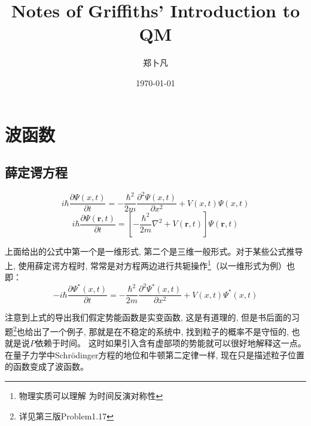 \documentclass[a4paper,zihao=-4,linespread=1]{ctexrep}
\title{Notes of Griffiths' Introduction to QM}   %
\author{郑卜凡}                     %
\date{\today}                             %
\newenvironment{lequation}{\large\begin{equation}}{\end{equation}}
\begin{document}
    \tableofcontents        %
    \setcounter{page}{0}
    \thispagestyle{empty}
    \chapter{波函数}
    \section{薛定谔方程}
    \begin{lequation}\label{S-1-D}
        \boxed{
            i\hbar\frac{\partial \Psi\left(x,t\right)}{\partial t}=-\frac{\hbar^{2}}{2m}\frac{\partial^{2}\Psi\left(x,t\right)}{\partial x^{2}}+
            V\left(x,t\right)\Psi\left(x,t\right)
        }
    \end{lequation}
    \begin{lequation}\label{S-3-D}
        \boxed{
            i\hbar\frac{\partial \Psi\left(\bm{r},t\right)}{\partial t}=\left[-\frac{\hbar^{2}}{2m}\nabla^{2}+
            V\left(\bm{r},t\right)\right]\Psi\left(\bm{r},t\right) 
        }
    \end{lequation}


    上面给出的公式中第一个是一维形式, 第二个是三维一般形式。对于某些公式推导上, 使用薛定谔方程时, 常常是对方程两边进行共轭操作\footnote{物理实质可以理解
    为时间反演对称性}（以一维形式为例）也即：
    \begin{lequation}
        -i\hbar\frac{\partial \Psi^{*}\left(x,t\right)}{\partial t}=-\frac{\hbar^{2}}{2m}\frac{\partial^{2}\Psi^{*}\left(x,t\right)}{\partial x^{2}}+
        V\left(x,t\right)\Psi^{*}\left(x,t\right)
    \end{lequation}


    注意到上式的导出我们假定势能函数是实变函数, 这是有道理的, 但是书后面的习题\footnote{详见第三版Problem1.17}也给出了一个例子, 那就是在不稳定的系统中, 找到粒子的概率不是守恒的, 也就是说$P$依赖于时间。
    这时如果引入含有虚部项的势能就可以很好地解释这一点。在量子力学中Schr{\"o}dinger方程的地位和牛顿第二定律一样, 现在只是描述粒子位置的函数变成了波函数。
\end{document}
